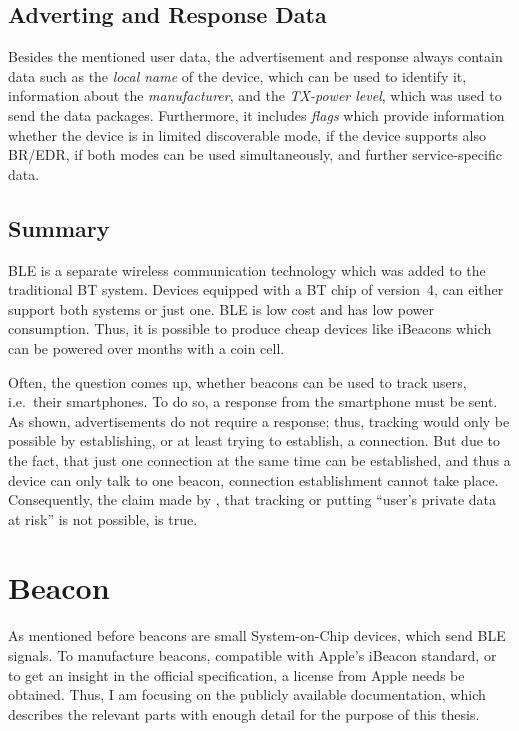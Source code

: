 \subsection*{Adverting and Response Data}
Besides the mentioned user data, the advertisement and response always contain data such as the \emph{local name} of the device, which can be used to identify it, information about the \emph{manufacturer}, and the \emph{\acs{TX}-power level}, which was used to send the data packages. Furthermore, it includes \emph{flags} which provide information whether the device is in limited discoverable mode, if the device supports also \ac{BR}/\ac{EDR}, if both modes can be used simultaneously, and further service-specific data.


\subsection*{Summary}
\acl{BLE} is a separate wireless communication technology which was added to the traditional \acl{BT} system. Devices equipped with a \ac{BT} chip of version~4, can either support both systems or just one. \ac{BLE} is low cost and has low power consumption. Thus, it is possible to produce cheap devices like iBeacons which can be powered over months with a coin cell.

Often, the question comes up, whether beacons can be used to track users, i.e.\ their smartphones. To do so, a response from the smartphone must be sent. As shown, advertisements do not require a response; thus, tracking would only be possible by establishing, or at least trying to establish, a connection. But due to the fact, that just one connection at the same time can be established, and thus a device can only talk to one beacon, connection establishment cannot take place. Consequently, the claim made by \citet{apple:getting_started}, that tracking or putting ``user's private data at risk'' is not possible, is true.

\section{Beacon}\label{sec:beacon}
As mentioned before beacons are small System-on-Chip devices, which send \acs{BLE} signals. To manufacture beacons, compatible with Apple's iBeacon standard, or to get an insight in the official specification, a license from Apple needs be obtained. Thus, I am focusing on the publicly available documentation, which describes the relevant parts with enough detail for the purpose of this thesis.

